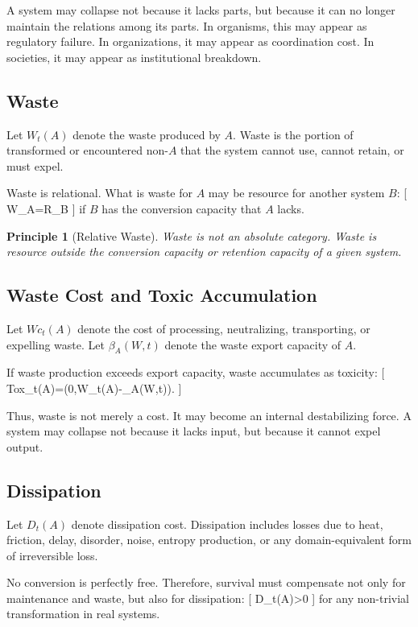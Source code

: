 \documentclass[11pt,a4paper]{article}
\newtheorem{principle}{Principle}
\begin{document}
A system may collapse not because it lacks parts, but because it can no longer maintain the relations among its parts. In organisms, this may appear as regulatory failure. In organizations, it may appear as coordination cost. In societies, it may appear as institutional breakdown.

\subsection{Waste}

Let $W_t(A)$ denote the waste produced by $A$. Waste is the portion of transformed or encountered non-$A$ that the system cannot use, cannot retain, or must expel.

Waste is relational. What is waste for $A$ may be resource for another system $B$:
[
W_A=R_B
]
if $B$ has the conversion capacity that $A$ lacks.

\begin{principle}[Relative Waste]
Waste is not an absolute category. Waste is resource outside the conversion capacity or retention capacity of a given system.
\end{principle}

\subsection{Waste Cost and Toxic Accumulation}

Let $Wc_t(A)$ denote the cost of processing, neutralizing, transporting, or expelling waste. Let $\beta_A(W,t)$ denote the waste export capacity of $A$.

If waste production exceeds export capacity, waste accumulates as toxicity:
[
Tox_t(A)=\max(0,W_t(A)-\beta_A(W,t)).
]

Thus, waste is not merely a cost. It may become an internal destabilizing force. A system may collapse not because it lacks input, but because it cannot expel output.

\subsection{Dissipation}

Let $D_t(A)$ denote dissipation cost. Dissipation includes losses due to heat, friction, delay, disorder, noise, entropy production, or any domain-equivalent form of irreversible loss.

No conversion is perfectly free. Therefore, survival must compensate not only for maintenance and waste, but also for dissipation:
[
D_t(A)>0
]
for any non-trivial transformation in real systems.
\end{document}
